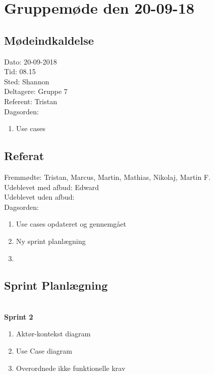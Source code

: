 \section{Gruppemøde den 20-09-18}
\subsection{Mødeindkaldelse}
Dato: 20-09-2018
\\Tid: 08.15
\\Sted: Shannon 
\\Deltagere: Gruppe 7
\\Referent: Tristan
\\Dagsorden:
\begin{enumerate}
    \item Use cases
\end{enumerate}

\subsection{Referat}
 Fremmødte: Tristan, Marcus, Martin, Mathias, Nikolaj, Martin F. 
 \\Udeblevet med afbud: Edward
 \\Udeblevet uden afbud: 
 \\Dagsorden: 
 \begin{enumerate}
    \item Use cases opdateret og gennemgået
    \item Ny sprint planlægning 
    \item 
\end{enumerate}

\subsection{Sprint Planlægning}
\\\textbf{Sprint 2}
\begin{enumerate}
    \item Aktør-kontekst diagram
    \item Use Case diagram
    \item Overordnede ikke funktionelle krav
\end{enumerate}
